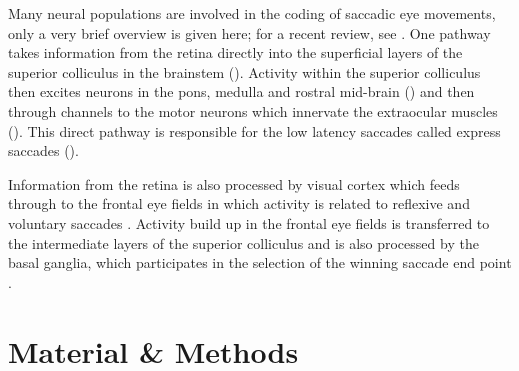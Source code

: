 \documentclass{frontiersSCNS}
\begin{document}


Many neural populations are involved in the coding of saccadic eye
movements, only a very brief overview is given here; for a recent
review, see \cite{munoz_commentary:_2002}. One pathway takes
information from the retina directly into the superficial layers of
the superior colliculus in the brainstem (\cite{sterling_receptive_1971,linden_massive_1983,wu_involvement_1994}).
Activity within
the superior colliculus then excites neurons in the pons, medulla and
rostral mid-brain (\cite{sparks_brainstem_2002}) and then through
channels to the motor neurons which innervate the extraocular muscles
(\cite{fuchs_firing_1970,sparks_brainstem_2002}). This direct pathway
is responsible for the low latency saccades called express saccades
(\cite{schiller_effect_1987,edelman_activity_1996}).

Information from the retina is also processed by visual cortex which
feeds through to the frontal eye fields in which activity is related
to reflexive and voluntary
saccades \cite{schall_neural_1999}. Activity build up in the frontal
eye fields is transferred to the intermediate layers of the superior
colliculus
\cite{stanton_frontal_1988-1} and is also processed by the basal ganglia, which
participates in the selection of the winning saccade end point
\cite{stanton_frontal_1988}.





\section{Material \& Methods}
\end{document}
